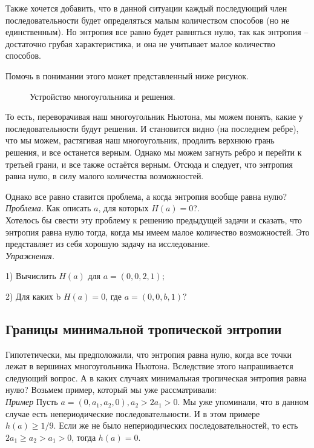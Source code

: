 \documentclass[russian]{lecture-notes}
\begin{document}
Также хочется добавить, что в данной ситуации каждый последующий член последовательности будет определяться малым количеством способов (но не единственным). Но энтропия все равно будет равняться нулю, так как энтропия -- достаточно грубая характеристика, и она не учитывает малое количество способов.

Помочь в понимании этого может представленный ниже рисунок.

\begin{figure}[h]
\caption{Устройство многоугольника и решения.}
\end{figure}

То есть, переворачивая наш многоугольник Ньютона, мы можем понять, какие у последовательности будут решения. И становится видно (на последнем ребре), что мы можем, растягивая наш многоугольник, продлить верхнюю грань решения, и все останется верным. Однако мы можем загнуть ребро и перейти к третьей грани, и все также остаётся верным. Отсюда и следует, что энтропия равна нулю, в силу малого количества возможностей.

Однако все равно ставится проблема, а когда энтропия вообще равна нулю?\\

\emph{ Проблема.}  Как описать $a$, для которых $H(a)=0$?.\\

Хотелось бы свести эту проблему к решению предыдущей задачи и сказать, что энтропия равна нулю тогда, когда мы имеем малое количество возможностей. Это представляет из себя хорошую задачу на исследование.\\

\emph{Упражнения.}

1) Вычислить $H(a)$ для $a = (0,0,2,1);$

2) Для каких b $H(a) = 0$, где $a = (0,0,b,1)?$
\subsection{Границы минимальной тропической энтропии}


Гипотетически, мы предположили, что энтропия равна нулю, когда все точки лежат в вершинах многоугольника Ньютона. Вследствие этого напрашивается следующий вопрос. А в каких случаях минимальная тропическая энтропия равна нулю? Возьмем пример, который мы уже рассматривали:\\

\emph{ Пример} Пусть $a=(0,a_1,a_2,0), a_2>2a_1>0.$ Мы уже упоминали, что в данном случае есть непериодические последовательности. И в этом примере $h(a) \ge 1/9$. Если же не было непериодических последовательностей, то есть $2a_1 \ge a_2>a_1>0$, тогда $h(a) = 0$.\\
\end{document}
